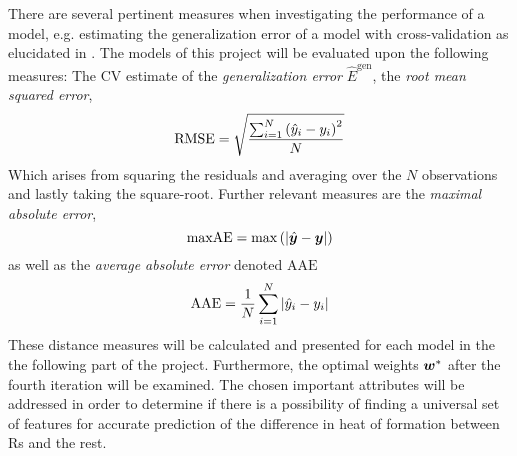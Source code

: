 
\singlefirstrsnias
{}\singlefirstrszb
{}\singlefirstrswz

\singlesecondrsnias
{}\singlesecondrszb
{}\singlesecondrswz

\singlethirdrsnias
{}\singlethirdrszb
{}\singlethirdrswz

\singlefourthrsnias
{}\singlefourthrszb
{}\singlefourthrswz






\thispagestyle{empty}

There are several pertinent measures when investigating the performance of a model, e.g. estimating the generalization error of a model with cross-validation as elucidated in . The models of this project will be evaluated upon the following measures: 
The CV estimate of the \emph{generalization error} $\hat{E}^{\mathrm{gen}}$, the \emph{root mean squared error}, 
\begin{equation}
    \mathrm{RMSE} = \sqrt{ \dfrac{\sum_{i=1}^{N} \qty(\hat{y}_i - y_i)^2 }{N}  }
\end{equation}
Which arises from squaring the residuals and averaging over the $N$ observations and lastly taking the square-root. Further relevant measures are the \emph{maximal absolute error},
\begin{equation}
    \mathrm{maxAE} = \max\qty(\abs{\hat{\bm{y}}-\bm{y}})
\end{equation}
as well as the \emph{average absolute error} denoted $\mathrm{AAE}$
\begin{equation}
    \mathrm{AAE}   = \dfrac{1}{N} \sum_{i=1}^{N} \abs{\hat{y}_i - y_i}
\end{equation}
These distance measures will be calculated and presented for each model in the the following part of the project. Furthermore, the optimal weights $\boldsymbol{w}^*$ after the fourth iteration will be examined. The chosen important attributes will be addressed in order to determine if there is a possibility of finding a universal set of features for accurate prediction of the difference in heat of formation between Rs and the rest. 

